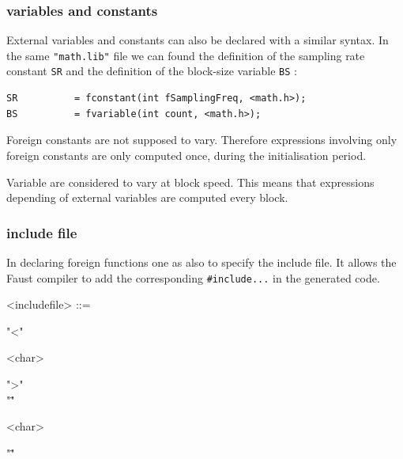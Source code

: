 \documentclass[a4paper]{book}
\begin{document}

\subsubsection{variables and constants} 
External variables and constants can also be declared with a similar syntax. In the same \lstinline'"math.lib"' file we can found the definition of the sampling rate constant \lstinline'SR' and the definition of the block-size variable \lstinline'BS' :

\begin{lstlisting}
SR 			= fconstant(int fSamplingFreq, <math.h>);
BS          = fvariable(int count, <math.h>);
\end{lstlisting}

Foreign constants are not supposed to vary. Therefore expressions involving only foreign constants are only computed once, during the initialisation period. 

Variable are considered to vary at block speed. This means that expressions depending of external variables are computed every block.


\subsubsection{include file}
In declaring foreign functions one as also to specify the include file. It allows the Faust compiler to add the corresponding \lstinline'#include...' in the generated code.

\begin{grammar}
  <includefile> ::= 
  \begin{syntdiag}
    \begin{stack}
      "<"
      \begin{rep}
        <char>
      \end{rep}
      ">" \\ 
      "\""
      \begin{rep}
        <char>
      \end{rep}
      "\""
    \end{stack}
  \end{syntdiag}
\end{grammar}
\end{document}
